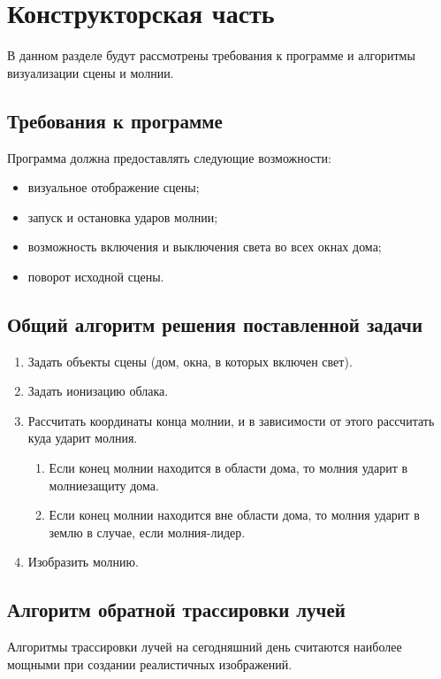 \chapter{Конструкторская часть}
В данном разделе будут рассмотрены требования к программе и алгоритмы визуализации сцены и молнии.


\section{Требования к программе}
Программа должна предоставлять следующие возможности:
\begin{itemize}
	\item визуальное отображение сцены;
	\item запуск и остановка ударов молнии;
	\item возможность включения и выключения света во всех окнах дома;
	\item поворот исходной сцены.
\end{itemize}


\section{Общий алгоритм решения поставленной задачи}
\begin{enumerate}
	\item Задать объекты сцены (дом, окна, в которых включен свет).
	\item Задать ионизацию облака.
	\item Рассчитать координаты конца молнии, и в зависимости от этого рассчитать куда ударит молния.
	\begin{enumerate}
		\item Если конец молнии находится в области дома, то молния ударит в молниезащиту дома.
		\item Если конец молнии находится вне области дома, то молния ударит в землю в случае, если молния-лидер.
	\end{enumerate}
	\item Изобразить молнию.
\end{enumerate}


\section{Алгоритм обратной трассировки лучей}

Алгоритмы трассировки лучей на сегодняшний день считаются наиболее мощными при создании реалистичных изображений. 

